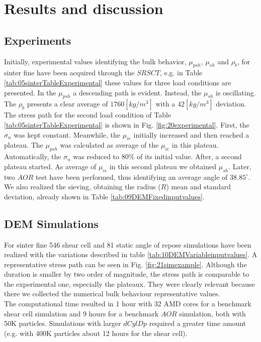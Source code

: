 \section{Results and discussion}
\label{sec:results}

\subsection{Experiments}
\label{subsec:experiments}

Initially, experimental values identifying the bulk behavior, $\mu_{psh}$, $\mu_{sh}$ and $\rho_{b}$, 
for sinter fine have been acquired through the $SRSCT$, e.g. in Table
\ref{tab:05sinterTableExperimental}
these values for three load conditions are presented.
In the $\mu_{psh}$ a descending path is evident. 
Instead, the $\mu_{sh}$ is oscillating.
The $\rho_b$ presents a clear average of $1760 [kg/m^3]$ with a $42 [kg/m^3]$
deviation.
The stress path for the second load condition of Table
\ref{tab:05sinterTableExperimental} is shown in Fig.
\ref{fig:20experimental}.
First, the $\sigma_n$ was kept constant. 
Meanwhile, the $\mu_{ie}$ initially increased and then reached a plateau.
The $\mu_{psh}$ was calculated as average of the $\mu_{ie}$ in this plateau.
Automatically, the $\sigma_n$ was reduced to $80 \%$ of its initial value.
After, a second plateau started.
As average of $\mu_{ie}$ in this second plateau we obtained $\mu_{sh}$.
Later, two $AOR$ test have been performed, thus identifying an average angle of
$38.85 ^\circ$.
We also realized the sieving, obtaining the radius ($R$) mean and standard
deviation, already shown in Table \ref{tab:09DEMFixedinputvalues}.



\subsection{DEM Simulations}
\label{subsec:simulations}

For sinter fine 546 shear cell and 81 static angle of repose simulations have
been realized with the variations described in table
\ref{tab:10DEMVariableinputvalues}.
A representative stress path can be seen in Fig. \ref{fig:21simexample}.
Although the duration is smaller by two order of magnitude, the stress path is
comparable to the experimental one, especially the plateaux.
They were clearly relevant because there we collected the numerical bulk
behaviour representative values.\\
The computational time resulted in 1 hour with 32 AMD cores for a benchmark
shear cell simulation and 9 hours for a benchmark $AOR$ simulation, both with 50K particles. 
Simulations with larger $dCylDp$ required a greater time amount (e.g. with 400K
particles about 12 hours for the shear cell). \\


